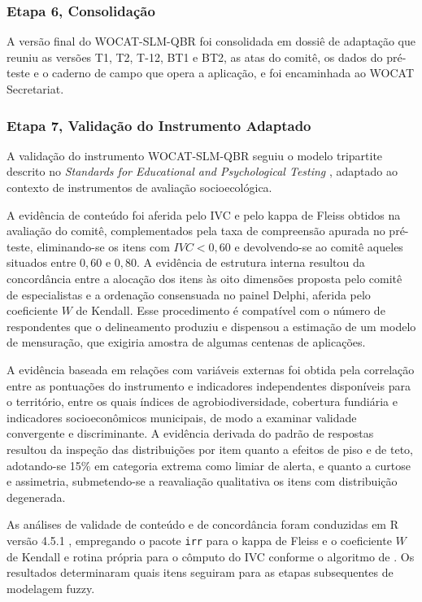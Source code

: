 \documentclass[preprint,authoryear,12pt]{elsarticle}
\begin{document}
\subsubsection{Etapa 6, Consolidação}

A versão final do WOCAT-SLM-QBR foi consolidada em dossiê de adaptação que reuniu as versões T1, T2, T-12, BT1 e BT2, as atas do comitê, os dados do pré-teste e o caderno de campo que opera a aplicação, e foi encaminhada ao WOCAT Secretariat.

\subsubsection{Etapa 7, Validação do Instrumento Adaptado}

A validação do instrumento WOCAT-SLM-QBR seguiu o modelo tripartite descrito no \textit{Standards for Educational and Psychological Testing} \citep{Association2018}, adaptado ao contexto de instrumentos de avaliação socioecológica.

A evidência de conteúdo foi aferida pelo IVC e pelo kappa de Fleiss obtidos na avaliação do comitê, complementados pela taxa de compreensão apurada no pré-teste, eliminando-se os itens com $IVC < 0{,}60$ e devolvendo-se ao comitê aqueles situados entre $0{,}60$ e $0{,}80$. A evidência de estrutura interna resultou da concordância entre a alocação dos itens às oito dimensões proposta pelo comitê de especialistas e a ordenação consensuada no painel Delphi, aferida pelo coeficiente $W$ de Kendall. Esse procedimento é compatível com o número de respondentes que o delineamento produziu e dispensou a estimação de um modelo de mensuração, que exigiria amostra de algumas centenas de aplicações.

A evidência baseada em relações com variáveis externas foi obtida pela correlação entre as pontuações do instrumento e indicadores independentes disponíveis para o território, entre os quais índices de agrobiodiversidade, cobertura fundiária e indicadores socioeconômicos municipais, de modo a examinar validade convergente e discriminante. A evidência derivada do padrão de respostas resultou da inspeção das distribuições por item quanto a efeitos de piso e de teto, adotando-se 15\% em categoria extrema como limiar de alerta, e quanto a curtose e assimetria, submetendo-se a reavaliação qualitativa os itens com distribuição degenerada.

As análises de validade de conteúdo e de concordância foram conduzidas em R versão 4.5.1 \citep{RCore2024}, empregando o pacote \texttt{irr} para o kappa de Fleiss e o coeficiente $W$ de Kendall e rotina própria para o cômputo do IVC conforme o algoritmo de \citet{Hernandez-Nieto2002}. Os resultados determinaram quais itens seguiram para as etapas subsequentes de modelagem fuzzy.
\end{document}
